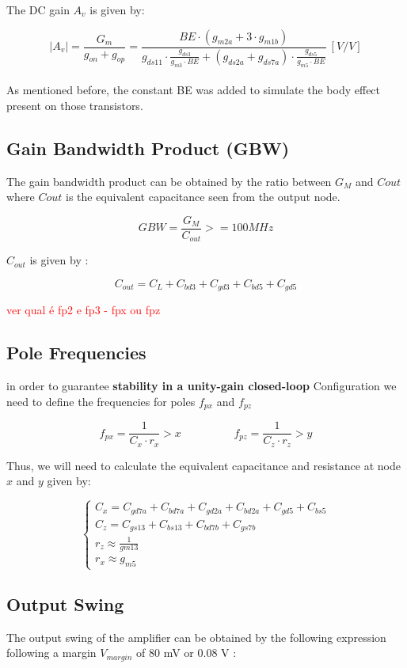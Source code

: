 The DC gain $A_v$ is given by:

$$|A_v| = \frac{G_m}{g_{on} + g_{op}} = \frac{BE \cdot (g_{m2a} + 3 \cdot g_{m1b})}{g_{ds11} \cdot \frac{g_{ds3}}{g_{m3}\cdot BE} + (g_{ds2a} + g_{ds7a}) \cdot \frac{g_{ds5}}{g_{m5} \cdot BE}} \ [V/V]$$ \\

As mentioned before, the constant BE was added to simulate the body effect present on those transistors.

\subsection{Gain Bandwidth Product (GBW)}
The gain bandwidth product can be obtained by the ratio between $G_M$ and $C{out}$ where $C{out}$ is the equivalent capacitance seen from the output node.

$$  GBW = \frac{G_M}{C_{out}} >= 100 MHz $$

$C_{out}$ is given by :

$$C_{out} = C_L + C_{bd3} + C_{gd3} + C_{bd5} + C_{gd5}$$

\textcolor{red}{ver qual é fp2 e fp3 - fpx ou fpz }

\subsection{Pole Frequencies}
in order to guarantee \textbf{stability in a unity-gain closed-loop} Configuration we need to define the frequencies
for poles $f_{px}$ and  $f_{pz}$

$$f_{px} = \frac{1}{C_x\cdot r_x} > x  \hspace{2cm}  f_{pz} = \frac{1}{C_z\cdot r_z} > y$$

Thus, we will need to calculate the equivalent capacitance and resistance at node $x$ and $y$ given by:

\begin{equation}
    \begin{cases}
        C_x = C_{gd7a} + C_{bd7a}+ C_{gd2a} + C_{bd2a} + C_{gd5} + C_{bs5}\\
        C_z = C_{gs13} + C_{bs13} + C_{bd7b}+ C_{gs7b} \\
        r_z \approx \frac{1}{gm13} \\
        r_x \approx g_{m5} 
    \end{cases}
\end{equation}

\subsection{Output Swing}
The output swing of the amplifier can be obtained by the following expression following a margin $V_{margin}$ of 80 mV or 0.08 V :

